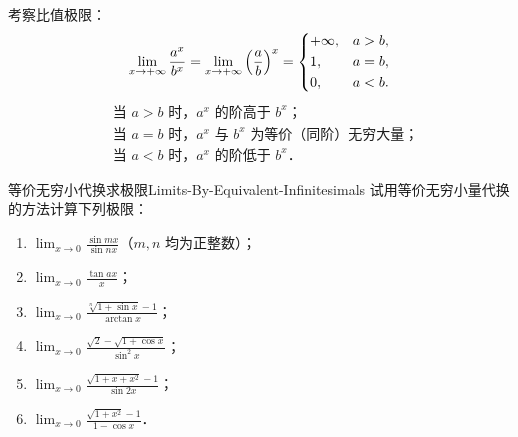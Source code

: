\begin{solution}

    考察比值极限：
    \begin{equation}
        \lim_{x\to +\infty} \frac{a^x}{b^x} = \lim_{x\to +\infty} \left( \frac{a}{b} \right)^x = \begin{dcases} +\infty, & a > b, \\ 1, & a = b, \\ 0, & a < b. \end{dcases}
    \end{equation}
    \begin{equation}
        \boxed{
            \begin{aligned}
                 & \text{当 } a > b \text{ 时，} a^x \text{ 的阶高于 } b^x\text{；}           \\
                 & \text{当 } a = b \text{ 时，} a^x \text{ 与 } b^x \text{ 为等价（同阶）无穷大量；} \\
                 & \text{当 } a < b \text{ 时，} a^x \text{ 的阶低于 } b^x\text{．}
            \end{aligned}
        }
    \end{equation}
\end{solution}

\begin{problem}{等价无穷小代换求极限}{Limits-By-Equivalent-Infinitesimals}
    试用等价无穷小量代换的方法计算下列极限：
    \begin{enumerate}
        \item $\lim_{x\to 0} \frac{\sin mx}{\sin nx}$（$m, n$ 均为正整数）；
        \item $\lim_{x\to 0} \frac{\tan ax}{x}$；
        \item $\lim_{x\to 0} \frac{\sqrt[n]{1+\sin x}-1}{\arctan x}$；
        \item $\lim_{x\to 0} \frac{\sqrt{2}-\sqrt{1+\cos x}}{\sin^2 x}$；
        \item $\lim_{x\to 0} \frac{\sqrt{1+x+x^2}-1}{\sin 2x}$；
        \item $\lim_{x\to 0} \frac{\sqrt{1+x^2}-1}{1-\cos x}$．
    \end{enumerate}
\end{problem}

